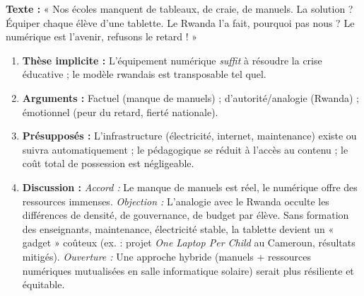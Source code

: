 \documentclass[11pt]{article}
\begin{document}
\begin{exemplebox}
\textbf{Texte :} « Nos écoles manquent de tableaux, de craie, de manuels. La solution ? Équiper chaque élève d'une tablette. Le Rwanda l'a fait, pourquoi pas nous ? Le numérique est l'avenir, refusons le retard ! »
\begin{enumerate}
    \item \textbf{Thèse implicite :} L'équipement numérique \emph{suffit} à résoudre la crise éducative ; le modèle rwandais est transposable tel quel.
    \item \textbf{Arguments :} Factuel (manque de manuels) ; d'autorité/analogie (Rwanda) ; émotionnel (peur du retard, fierté nationale).
    \item \textbf{Présupposés :} L'infrastructure (électricité, internet, maintenance) existe ou suivra automatiquement ; le pédagogique se réduit à l'accès au contenu ; le coût total de possession est négligeable.
    \item \textbf{Discussion :} \emph{Accord :} Le manque de manuels est réel, le numérique offre des ressources immenses. \emph{Objection :} L'analogie avec le Rwanda occulte les différences de densité, de gouvernance, de budget par élève. Sans formation des enseignants, maintenance, électricité stable, la tablette devient un « gadget » coûteux (ex. : projet \emph{One Laptop Per Child} au Cameroun, résultats mitigés). \emph{Ouverture :} Une approche hybride (manuels + ressources numériques mutualisées en salle informatique solaire) serait plus résiliente et équitable.
\end{enumerate}
\end{exemplebox}
\end{document}
